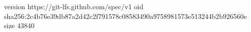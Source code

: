 version https://git-lfs.github.com/spec/v1
oid sha256:2c4b76e39db87a2d42c2f791578c08583490a9758981573e513244b2b926560e
size 43840

